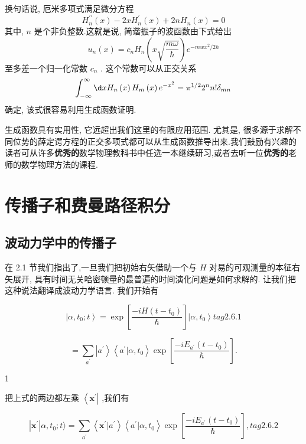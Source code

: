 \documentclass[lang=cn,newtx,10pt,scheme=chinese,thmcnt=section]{elegantbook}
\begin{document}
换句话说, 厄米多项式满足微分方程
\begin{equation}
	{H}_{n}^{\prime \prime }\left( x\right) - {2x}{H}_{n}^{\prime }\left( x\right) + {2n}{H}_{n}\left( x\right) = 0
\end{equation}
其中, $n$ 是个非负整数.这就是说, 简谐振子的波函数由下式给出
\begin{equation}
	{u}_{n}\left( x\right) = {c}_{n}{H}_{n}\left( {x\sqrt{\frac{m\omega }{\hbar }}}\right) {e}^{-{mw}{x}^{2}/{2h}}
\end{equation}
至多差一个归一化常数 ${c}_{n}$ . 这个常数可以从正交关系
\begin{equation}
	\int_{-\infty }^{\infty }{\d x}{H}_{n}\left( x\right) {H}_{m}\left( x\right) {e}^{-{x}^{2}} = {\pi }^{1/2}{2}^{n}n!{\delta }_{mn}
\end{equation}
确定, 该式很容易利用生成函数证明.

生成函数具有实用性, 它远超出我们这里的有限应用范围. 尤其是, 很多源于求解不同位势的薛定谔方程的正交多项式都可以从生成函数推导出来.我们鼓励有兴趣的读者可从许多\textbf{优秀的}数学物理教科书中任选一本继续研习,或者去听一位\textbf{优秀的}老师的数学物理方法的课程.

\section{传播子和费曼路径积分}
\subsection*{波动力学中的传播子}
在 2.1 节我们指出了,一旦我们把初始右矢借助一个与 $H$ 对易的可观测量的本征右矢展开, 具有时间无关哈密顿量的最普遍的时间演化问题是如何求解的. 让我们把这种说法翻译成波动力学语言. 我们开始有

$$
\left| {\alpha ,{t}_{0};t}\right\rangle = \exp \left\lbrack \frac{-{iH}\left( {t - {t}_{0}}\right) }{\hbar }\right\rbrack \left| {\alpha ,{t}_{0}}\right\rangle tag{2.6.1}
$$

$$
= \mathop{\sum }\limits_{{a}^{\prime }}\left| {a}^{\prime }\right\rangle \left\langle {{a}^{\prime } | \alpha ,{t}_{0}}\right\rangle \exp \left\lbrack \frac{-i{E}_{{a}^{\prime }}\left( {t - {t}_{0}}\right) }{\hbar }\right\rbrack .
$$

1

把上式的两边都左乘 $\left\langle {\mathbf{x}}^{\prime }\right|$ ,我们有

$$
\left| {\mathbf{x}}^{\prime }\right| \alpha ,{t}_{0};t\rangle = \mathop{\sum }\limits_{{a}^{\prime }}\left\langle {{\mathbf{x}}^{\prime } | {a}^{\prime }}\right\rangle \left\langle {{a}^{\prime } | \alpha ,{t}_{0}}\right\rangle \exp \left\lbrack \frac{-i{E}_{{a}^{\prime }}\left( {t - {t}_{0}}\right) }{\hbar }\right\rbrack , tag{2.6.2}
$$
\end{document}
